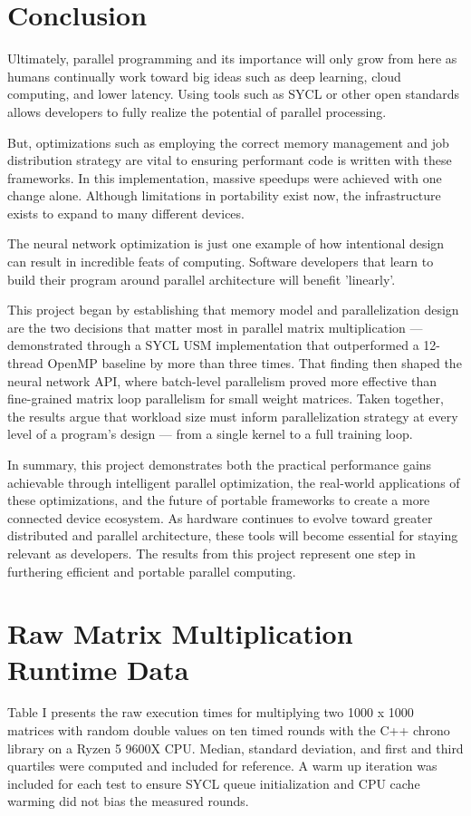 \documentclass[journal]{IEEEtran}
\begin{document}
\section{Conclusion}
\par Ultimately, parallel programming and its importance will only grow 
from here as humans continually work toward big ideas such as deep 
learning, cloud computing, and lower latency. Using tools such as SYCL 
or other open standards allows developers to fully realize the potential 
of parallel processing.
\par But, optimizations such as employing the correct memory management 
and job distribution strategy are vital to ensuring performant code is 
written with these frameworks. In this implementation, massive speedups 
were achieved with one change alone. Although limitations in portability 
exist now, the infrastructure exists to expand to many different devices.
\par The neural network optimization is just one example of how 
intentional design can result in incredible feats of computing. Software 
developers that learn to build their program around parallel architecture 
will benefit 'linearly'.
\par This project began by establishing that memory model and 
parallelization design are the two decisions that matter most in 
parallel matrix multiplication — demonstrated through a SYCL USM 
implementation that outperformed a 12-thread OpenMP baseline by more 
than three times. That finding then shaped the neural network API, where 
batch-level parallelism proved more effective than fine-grained matrix 
loop parallelism for small weight matrices. Taken together, the results 
argue that workload size must inform parallelization strategy at every 
level of a program's design — from a single kernel to a full training 
loop.
\par In summary, this project demonstrates both the practical performance 
gains achievable through intelligent parallel optimization, the 
real-world applications of these optimizations, and the future of 
portable frameworks to create a more connected device ecosystem. As 
hardware continues to evolve toward greater distributed and parallel 
architecture, these tools will become essential for staying relevant as 
developers. The results from this project represent one step in 
furthering efficient and portable parallel computing.

\appendices
\section{Raw Matrix Multiplication Runtime Data}
Table I presents the raw execution times for multiplying two 1000 x 1000 matrices with random double values on ten timed rounds with the C++ chrono library on a Ryzen 5 9600X CPU. Median, standard deviation, and first and third quartiles were computed and included for reference. A warm up iteration was included for each test to ensure SYCL queue initialization and CPU cache warming did not bias the measured rounds.
\end{document}
